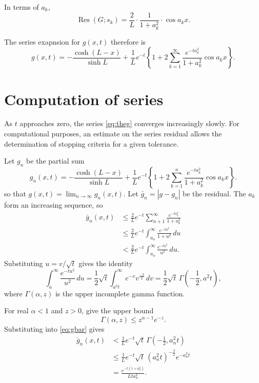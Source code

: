 \documentclass[parskip=half]{scrartcl}
\DeclareMathOperator{\Res}{Res}
\begin{document}
In terms of $a_k$,
\begin{equation}
    \Res(G; s_k) = \frac{2}{L}\cdot\frac{1}{1+a_k^2}\cdot\cos a_kx.
\end{equation}

The series exapnsion for $g(x, t)$ therefore is
\begin{equation}
    g(x, t) = -\frac{\cosh(L-x)}{\sinh L} + \frac{1}{L}e^{-t}\left\{
	1+2\sum_{k=1}^\infty \frac{e^{-ta_k^2}}{1+a_k^2}\cos a_k x\right\}.
    \label{eq:theg}
\end{equation}

\section{Computation of series}

As $t$ approaches zero, the series \eqref{eq:theg} converges increasingly slowly.
For computational purposes, an estimate on the series residual allows the determination
of stopping criteria for a given tolerance.

Let $g_n$ be the partial sum
\begin{equation}
    g_n(x, t) = -\frac{\cosh(L-x)}{\sinh L} + \frac{1}{L}e^{-t}\left\{
	1+2\sum_{k=1}^n \frac{e^{-ta_k^2}}{1+a_k^2}\cos a_k x\right\}.
\end{equation}
so that $g(x, t) =\lim_{n\to\infty} g_n(x,t)$. Let $\bar{g}_n = |g-g_n|$ be the
residual. The $a_k$ form an increasing sequence, so
\begin{equation}
    \begin{aligned}
	\bar{g}_n(x,t)
	    & \leq \frac{2}{L}e^{-t}\sum_{n+1}^\infty\frac{e^{-ta_k^2}}{1+a_k^2}\\
	    & \leq \frac{2}{L}e^{-t}\int_{a_n}^\infty \frac{e^{-tu^2}}{1+u^2}\,du\\
	    & < \frac{2}{L}e^{-t}\int_{a_n}^\infty \frac{e^{-tu^2}}{u^2}\,du.
    \end{aligned}
    \label{eq:gbar}
\end{equation}
Substituting $u=v/\sqrt{t}$ gives the identity
\begin{equation}
    \int_{a}^\infty \frac{e^{-tu^2}}{u^2}\,du
    = \frac{1}{2}\sqrt{t}\int_{a^2t}^\infty e^{-v} v^{\frac{-3}{2}}\,dv
    = \frac{1}{2}\sqrt{t}\,\Gamma(-\frac{1}{2},a^2 t),
\end{equation}
where $\Gamma(\alpha, z)$ is the upper incomplete gamma function.

For real $\alpha<1$ and $z>0$, \textcite[][Theorem 2.3]{borwein2009} give the upper bound
\[
    \Gamma(\alpha, z) \leq z^{\alpha-1} e^{-z}.
\]
Substituting into \eqref{eq:gbar} gives
\begin{equation}
    \begin{aligned}
	\bar{g}_n(x,t)
	    & < \frac{1}{L}e^{-t}\sqrt{t}\,\Gamma(-\frac{1}{2},a_n^2 t) \\
	    & \leq \frac{1}{L}e^{-t}\sqrt{t}\,(a_n^2 t)^{-\frac{3}{2}}e^{-a_n^2t} \\
            & = \frac{e^{-t(1+a_n^2)}}{L t a_n^3}.
    \end{aligned}
\end{equation}

\printbibliography
\end{document}

